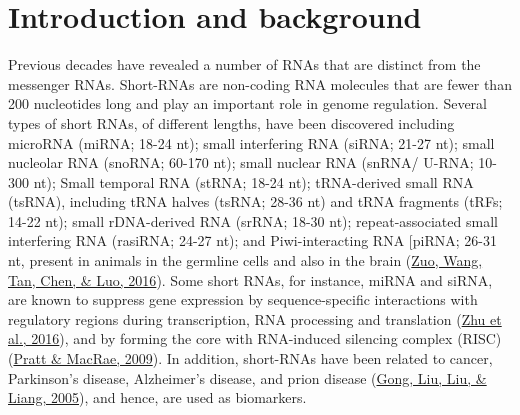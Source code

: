 \documentclass[12pt,twoside]{reedthesis}
\begin{document}
\hypertarget{introduction-and-background}{%
\section{Introduction and background}\label{introduction-and-background}}

Previous decades have revealed a number of RNAs that are distinct from
the messenger RNAs. Short-RNAs are non-coding RNA molecules that are
fewer than 200 nucleotides long and play an important role in genome
regulation. Several types of short RNAs, of different lengths, have been
discovered including microRNA (miRNA; 18-24 nt); small interfering RNA
(siRNA; 21-27 nt); small nucleolar RNA (snoRNA; 60-170 nt); small
nuclear RNA (snRNA/ U-RNA; 10-300 nt); Small temporal RNA (stRNA; 18-24
nt); tRNA-derived small RNA (tsRNA), including tRNA halves (tsRNA; 28-36
nt) and tRNA fragments (tRFs; 14-22 nt); small rDNA-derived RNA (srRNA;
18-30 nt); repeat-associated small interfering RNA (rasiRNA; 24-27 nt);
and Piwi-interacting RNA {[}piRNA; 26-31 nt, present in animals in the
germline cells and also in the brain (\protect\hyperlink{ref-zuo2016}{Zuo, Wang, Tan, Chen, \& Luo, 2016}). Some short RNAs, for
instance, miRNA and siRNA, are known to suppress gene expression by
sequence-specific interactions with regulatory regions during
transcription, RNA processing and translation (\protect\hyperlink{ref-zhu2016}{Zhu et al., 2016}), and by forming
the core with RNA-induced silencing complex (RISC) (\protect\hyperlink{ref-pratt2009}{Pratt \& MacRae, 2009}). In
addition, short-RNAs have been related to cancer, Parkinson's disease,
Alzheimer's disease, and prion disease (\protect\hyperlink{ref-gong2005}{Gong, Liu, Liu, \& Liang, 2005}), and hence, are used
as biomarkers.
\end{document}
